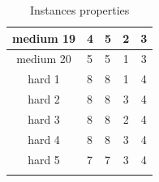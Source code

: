 \documentclass[headinclude, footinclude, abstract=on]{scrarticle}
\begin{document}
\begin{longtable}{|c||l|l|c|c|}
\hline
medium 19        & 4 & 5 & 2         & 3           \\ 
\hline
medium 20        & 5 & 5 & 1         & 3           \\ 
\hline
hard 1           & 8 & 8 & 1         & 4           \\ 
\hline
hard 2           & 8 & 8 & 3         & 4           \\ 
\hline
hard 3           & 8 & 8 & 2         & 4           \\ 
\hline
hard 4           & 8 & 8 & 3         & 4           \\ 
\hline
hard 5           & 7 & 7 & 3         & 4           \\
\hline
\caption{Instances properties}
\label{tbl:inst}
\end{longtable} 
\end{document}

